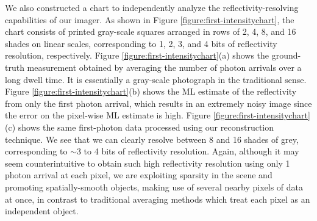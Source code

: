 We also constructed a chart to independently analyze the reflectivity-resolving capabilities of our imager. As shown in Figure \ref{figure:first-intensitychart}, the chart consists of printed gray-scale squares arranged in rows of 2, 4, 8, and 16 shades on linear scales, corresponding to 1, 2, 3, and 4 bits of reflectivity resolution, respectively. Figure \ref{figure:first-intensitychart}(a) shows the ground-truth measurement obtained by averaging the number of photon arrivals over a long dwell time. It is essentially a gray-scale photograph in the traditional sense. Figure \ref{figure:first-intensitychart}(b) shows the ML estimate of the reflectivity from only the first photon arrival, which results in an extremely noisy image since the error on the pixel-wise ML estimate is high. Figure \ref{figure:first-intensitychart}(c) shows the same first-photon data processed using our reconstruction technique. We see that we can clearly resolve between 8 and 16 shades of grey, corresponding to $\sim$3 to 4 bits of reflectivity resolution. Again, although it may seem counterintuitive to obtain such high reflectivity resolution using only 1 photon arrival at each pixel, we are exploiting sparsity in the scene and promoting spatially-smooth objects, making use of several nearby pixels of data at once, in contrast to traditional averaging methods which treat each pixel as an independent object.

